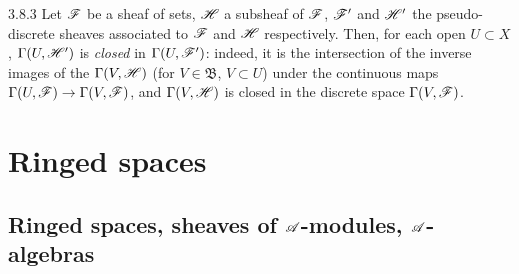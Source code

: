 \begin{env}{3.8.3}
\label{env-0.3.8.3}
Let $\mathscr{F}$ be a sheaf of sets, $\mathscr{H}$ a subsheaf of $\mathscr{F}$, $\mathscr{F}'$ and $\mathscr{H}'$ the
pseudo-discrete sheaves associated to $\mathscr{F}$ and $\mathscr{H}$ respectively. Then, for each open
$U\subset X$, $\Gamma(U,\mathscr{H}')$ is \emph{closed} in $\Gamma(U,\mathscr{F}')$: indeed, it is the
intersection of the inverse images of the $\Gamma(V,\mathscr{H})$ (for $V\in\mathfrak{B}$,
$V\subset U$) under the continuous maps $\Gamma(U,\mathscr{F})\to\Gamma(V,\mathscr{F})$, and
$\Gamma(V,\mathscr{H})$ is closed in the discrete space $\Gamma(V,\mathscr{F})$.
\end{env}

\section{Ringed spaces}
\label{0-prelim-4}

\subsection{Ringed spaces, sheaves of $\mathscr{A}$-modules, $\mathscr{A}$-algebras}
\label{0-prelim-4.1}

